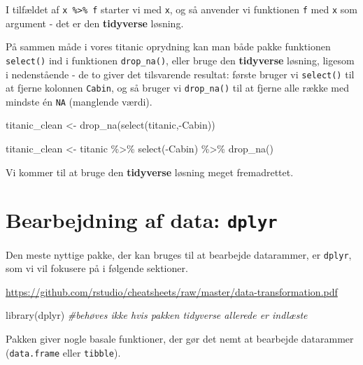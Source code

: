 \documentclass[
]{book}
\newenvironment{Shaded}{\begin{snugshade}}{\end{snugshade}}
\newcommand{\CommentTok}[1]{\textcolor[rgb]{0.56,0.35,0.01}{\textit{#1}}}
\newcommand{\FunctionTok}[1]{\textcolor[rgb]{0.00,0.00,0.00}{#1}}
\newcommand{\NormalTok}[1]{#1}
\newcommand{\OtherTok}[1]{\textcolor[rgb]{0.56,0.35,0.01}{#1}}
\newcommand{\SpecialCharTok}[1]{\textcolor[rgb]{0.00,0.00,0.00}{#1}}
\begin{document}
I tilfældet af \texttt{x\ \%\textgreater{}\%\ f} starter vi med \texttt{x}, og så anvender vi funktionen \texttt{f} med \texttt{x} som argument - det er den \textbf{tidyverse} løsning.

På sammen måde i vores titanic oprydning kan man både pakke funktionen \texttt{select()} ind i funktionen \texttt{drop\_na()}, eller bruge den \textbf{tidyverse} løsning, ligesom i nedenstående - de to giver det tilsvarende resultat: første bruger vi \texttt{select()} til at fjerne kolonnen \texttt{Cabin}, og så bruger vi \texttt{drop\_na()} til at fjerne alle række med mindste én \texttt{NA} (manglende værdi).

\begin{Shaded}
\begin{Highlighting}[]
\NormalTok{titanic\_clean }\OtherTok{\textless{}{-}} \FunctionTok{drop\_na}\NormalTok{(}\FunctionTok{select}\NormalTok{(titanic,}\SpecialCharTok{{-}}\NormalTok{Cabin))}

\NormalTok{titanic\_clean }\OtherTok{\textless{}{-}}\NormalTok{ titanic }\SpecialCharTok{\%\textgreater{}\%} 
    \FunctionTok{select}\NormalTok{(}\SpecialCharTok{{-}}\NormalTok{Cabin) }\SpecialCharTok{\%\textgreater{}\%}
    \FunctionTok{drop\_na}\NormalTok{() }
\end{Highlighting}
\end{Shaded}

Vi kommer til at bruge den \textbf{tidyverse} løsning meget fremadrettet.

\hypertarget{bearbejdning-af-data-dplyr}{%
\section{\texorpdfstring{Bearbejdning af data: \texttt{dplyr}}{Bearbejdning af data: dplyr}}\label{bearbejdning-af-data-dplyr}}

Den meste nyttige pakke, der kan bruges til at bearbejde datarammer, er \texttt{dplyr}, som vi vil fokusere på i følgende sektioner.

\url{https://github.com/rstudio/cheatsheets/raw/master/data-transformation.pdf}

\begin{Shaded}
\begin{Highlighting}[]
\FunctionTok{library}\NormalTok{(dplyr) }\CommentTok{\#behøves ikke hvis pakken tidyverse allerede er indlæste}
\end{Highlighting}
\end{Shaded}

Pakken giver nogle basale funktioner, der gør det nemt at bearbejde datarammer (\texttt{data.frame} eller \texttt{tibble}).
\end{document}
